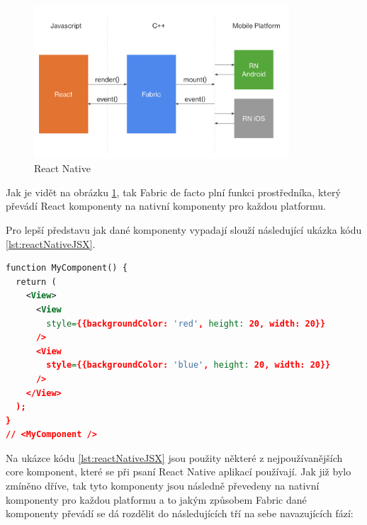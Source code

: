 \begin{figure}[H]
  \centering
  \includegraphics[width=0.85\textwidth]{react-natice-xplat-implementation-diagram.png}
  \caption{React Native }
  \label{fig:react-natice-xplat-implementation-diagram}
\end{figure}





Jak je vidět na obrázku \ref{fig:react-natice-xplat-implementation-diagram}, tak Fabric de facto plní funkci prostředníka, který převádí React 
komponenty na nativní komponenty pro každou platformu. 

Pro lepší představu jak dané komponenty vypadají slouží následující ukázka kódu \ref{lst:reactNativeJSX}.

\begin{lstlisting}[caption={Popis UI komponent pomoci JSX}, label={lst:reactNativeJSX}, language=XML]
function MyComponent() {
  return (
    <View>
      <View
        style={{backgroundColor: 'red', height: 20, width: 20}}
      />
      <View
        style={{backgroundColor: 'blue', height: 20, width: 20}}
      />
    </View>
  );
}
// <MyComponent />
\end{lstlisting}

Na ukázce kódu \ref{lst:reactNativeJSX} jsou použity některé z nejpoužívanějších core komponent, které se při psaní React
Native aplikací používají. \cite{reactNativeComponents} Jak již bylo zmíněno dříve, tak tyto komponenty jsou následně převedeny 
na nativní komponenty pro každou platformu a to jakým způsobem Fabric dané komponenty převádí se dá rozdělit do následujících tří
na sebe navazujících fází: \cite{reactNativeRenderCommitMount}
 
